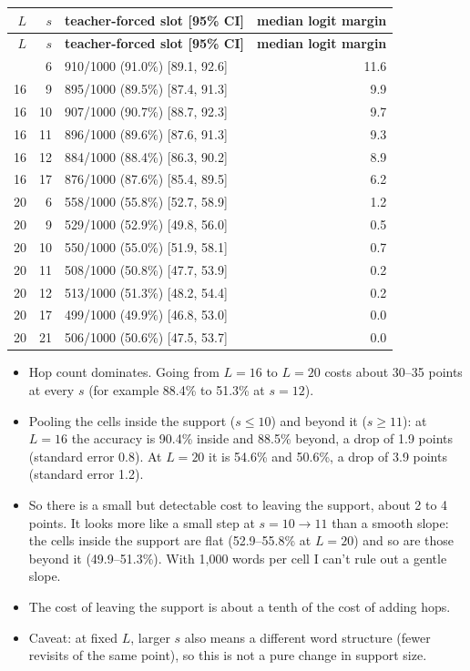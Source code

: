 \documentclass[paper=a4,fontsize=11pt,DIV=11,parskip=half,headings=small,numbers=noendperiod]{scrartcl}
\DeclareRobustCommand{\hdr}[1]{\textsf{\bfseries #1}}
\begin{document}
{\small\nopagebreak[4]
\begin{longtable}{@{}r r l r@{}}
\toprule
\hdr{$L$} & \hdr{$s$} & \hdr{teacher-forced slot [95\% CI]} & \hdr{median logit margin} \\
\midrule
\endfirsthead
\toprule
\hdr{$L$} & \hdr{$s$} & \hdr{teacher-forced slot [95\% CI]} & \hdr{median logit margin} \\
\midrule
\endhead
\bottomrule
\endlastfoot
16 & 6 & 910/1000 (91.0\%) [89.1, 92.6] & 11.6 \\
16 & 9 & 895/1000 (89.5\%) [87.4, 91.3] & 9.9 \\
16 & 10 & 907/1000 (90.7\%) [88.7, 92.3] & 9.7 \\
16 & 11 & 896/1000 (89.6\%) [87.6, 91.3] & 9.3 \\
16 & 12 & 884/1000 (88.4\%) [86.3, 90.2] & 8.9 \\
16 & 17 & 876/1000 (87.6\%) [85.4, 89.5] & 6.2 \\
20 & 6 & 558/1000 (55.8\%) [52.7, 58.9] & 1.2 \\
20 & 9 & 529/1000 (52.9\%) [49.8, 56.0] & 0.5 \\
20 & 10 & 550/1000 (55.0\%) [51.9, 58.1] & 0.7 \\
20 & 11 & 508/1000 (50.8\%) [47.7, 53.9] & 0.2 \\
20 & 12 & 513/1000 (51.3\%) [48.2, 54.4] & 0.2 \\
20 & 17 & 499/1000 (49.9\%) [46.8, 53.0] & 0.0 \\
20 & 21 & 506/1000 (50.6\%) [47.5, 53.7] & 0.0 \\
\end{longtable}}

\begin{itemize}
\item Hop count dominates. Going from $L=16$ to $L=20$ costs about 30–35 points at every $s$ (for example 88.4\%
  to 51.3\% at $s=12$).
\item Pooling the cells inside the support ($s\le10$) and beyond it ($s\ge11$): at $L=16$ the accuracy is 90.4\%
  inside and 88.5\% beyond, a drop of 1.9 points (standard error 0.8). At $L=20$ it is 54.6\% and 50.6\%, a drop
  of 3.9 points (standard error 1.2).
\item So there is a small but detectable cost to leaving the support, about 2 to 4 points. It looks more like a
  small step at $s=10\to11$ than a smooth slope: the cells inside the support are flat (52.9–55.8\% at $L=20$)
  and so are those beyond it (49.9–51.3\%). With 1,000 words per cell I can’t rule out a gentle slope.
\item The cost of leaving the support is about a tenth of the cost of adding hops.
\item Caveat: at fixed $L$, larger $s$ also means a different word structure (fewer revisits of the same point),
  so this is not a pure change in support size.
\end{itemize}
\end{document}
